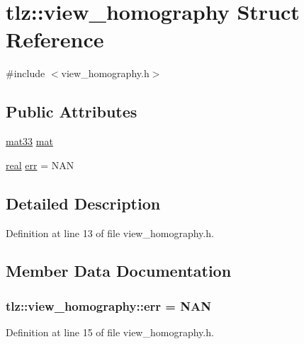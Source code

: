 \hypertarget{structtlz_1_1view__homography}{}\section{tlz\+:\+:view\+\_\+homography Struct Reference}
\label{structtlz_1_1view__homography}


{\ttfamily \#include $<$view\+\_\+homography.\+h$>$}

\subsection*{Public Attributes}
\begin{DoxyCompactItemize}
\item 
\hyperlink{namespacetlz_a6679497d5121f319147594e1f344ef57}{mat33} \hyperlink{structtlz_1_1view__homography_ac1e52bf8cd63adbfb89179c618fbe9d3}{mat}
\item 
\hyperlink{namespacetlz_a15fd37cce97f2b8b606af18c2615f602}{real} \hyperlink{structtlz_1_1view__homography_a03fdc6014f5e21a3d5a86cc7e312b034}{err} = N\+AN
\end{DoxyCompactItemize}


\subsection{Detailed Description}


Definition at line 13 of file view\+\_\+homography.\+h.



\subsection{Member Data Documentation}
\subsubsection[{\texorpdfstring{err}{err}}]{ tlz\+::view\+\_\+homography\+::err = N\+AN}\hypertarget{structtlz_1_1view__homography_a03fdc6014f5e21a3d5a86cc7e312b034}{}\label{structtlz_1_1view__homography_a03fdc6014f5e21a3d5a86cc7e312b034}


Definition at line 15 of file view\+\_\+homography.\+h.

